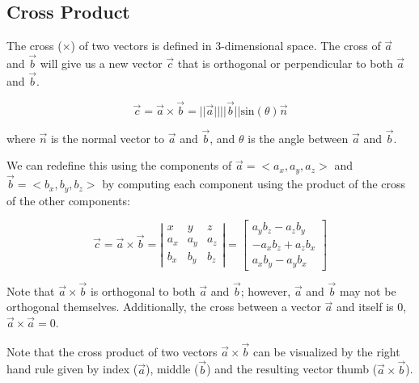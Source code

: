 \documentclass[12pt,letterpaper]{article}
\begin{document}
\subsection{Cross Product}
The cross ($\times$) of two vectors is defined in 3-dimensional space. The cross of $\overrightarrow{a}$ and $\overrightarrow{b}$ will give us a new vector $\overrightarrow{c}$ that is orthogonal or perpendicular to both $\overrightarrow{a}$ and $\overrightarrow{b}$.

\begin{equation}
   \overrightarrow{c} = \overrightarrow{a} \times \overrightarrow{b} = ||\overrightarrow{a}||||\overrightarrow{b}||\text{sin}(\theta)\overrightarrow{n}
\end{equation}

where $\overrightarrow{n}$ is the normal vector to $\overrightarrow{a}$ and $\overrightarrow{b}$, and $\theta$ is the angle between $\overrightarrow{a}$ and $\overrightarrow{b}$.

We can redefine this using the components of $\overrightarrow{a} = <a_x, a_y, a_z>$ and \\ $\overrightarrow{b} = <b_x, b_y, b_z>$ by computing each component using the product of the cross of the other components:

\begin{equation}
   \overrightarrow{c} = \overrightarrow{a} \times \overrightarrow{b} =
   \left|\begin{array}{ccc}
    x & y &  z \\
    a_x & a_y & a_z \\
    b_x & b_y & b_z
    \end{array}\right| =
    \begin{bmatrix}
        a_y b_z - a_z b_y \\
        - a_x b_z + a_z b_x \\
        a_x b_y - a_y b_x
    \end{bmatrix}
\end{equation}

Note that $\overrightarrow{a} \times \overrightarrow{b}$ is orthogonal to both $\overrightarrow{a}$ and $\overrightarrow{b}$; however, $\overrightarrow{a}$ and $\overrightarrow{b}$ may not be orthogonal themselves. Additionally, the cross between a vector $\overrightarrow{a}$ and itself is 0, $\overrightarrow{a} \times \overrightarrow{a} = 0$.

Note that the cross product of two vectors $\overrightarrow{a} \times \overrightarrow{b}$ can be visualized by the right hand rule given by index ($\overrightarrow{a}$), middle ($\overrightarrow{b}$) and the resulting vector thumb ($\overrightarrow{a} \times \overrightarrow{b}$).
\end{document}
